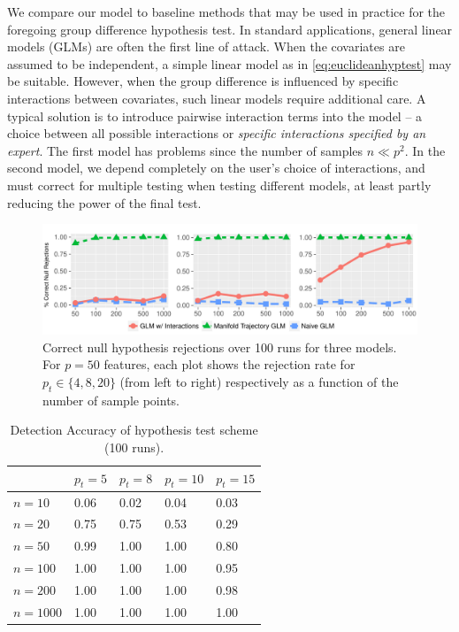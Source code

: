 	
We compare our model to baseline methods that may be used in practice for the foregoing 
group difference hypothesis test. In standard applications, general linear models (GLMs) are often the first line of attack. 
When the covariates are assumed to be independent, a simple linear model as in \eqref{eq:euclideanhyptest} may be suitable. 
However, when the group difference is influenced by specific interactions between covariates, such linear models require additional care. 
A typical solution is to introduce pairwise interaction terms into the model -- a choice between 
all possible interactions or \textit{specific interactions specified by an expert}. The first model has 
problems since the number of samples $n \ll p^2$. In the second model, we depend completely on the user's choice of interactions, 
and must correct for multiple testing when testing different models, at least partly reducing the power of the final test.
%
\begin{figure}
	\begin{center}
		\includegraphics[width=\textwidth]{3_covtraj/figs/sim_results.pdf}
		\caption[Synthetic hypothesis testing true positive rates]{\label{fg:sim_graphs}{\footnotesize Correct null hypothesis rejections over 100 runs for three models. For $p = 50$ features, each plot shows the rejection rate
		for $p_t \in \{4, 8, 20\}$ (from left to right) respectively as a function of the number of sample points.} }
	\end{center}
\end{figure}
%	
\begin{table}
	{
		\caption{\label{tab:recover-table} Detection Accuracy of hypothesis test scheme (100 runs).}
		\begin{center}
			{\begin{tabular}{lllll}
					\toprule
					\toprule
					& $p_t = 5$& $p_t = 8$	& $p_t = 10$&  $p_t = 15$ 	\\
					\midrule
					$n=10$	&  0.06  &  0.02  &  0.04  &  0.03 \\
					$n=20$	&  0.75  &  0.75  &  0.53  &  0.29 \\
					$n=50$	&  0.99  &  1.00  &  1.00  &  0.80 \\
					$n=100$	&  1.00  &  1.00  &  1.00  &  0.95 \\
					$n=200$	&  1.00  &  1.00  &  1.00  &  0.98 \\
					$n=1000$&  1.00  &  1.00  &  1.00  &  1.00 \\
					\bottomrule
					\bottomrule
			\end{tabular}}
		\end{center}
	}
\end{table}
